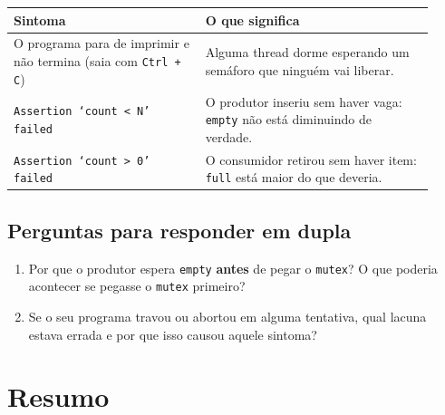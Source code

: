 \documentclass[11pt,a4paper]{article}
\newcommand{\cmd}[1]{\texttt{#1}}
\begin{document}
\begin{center}
\begin{tabular}{@{}R{0.42\linewidth}R{0.5\linewidth}@{}}
\toprule
\textbf{Sintoma} & \textbf{O que significa} \\
\midrule
O programa para de imprimir e não termina (saia com \cmd{Ctrl + C}) & Alguma thread dorme esperando um semáforo que ninguém vai liberar. \\
\cmd{Assertion `count < N' failed} & O produtor inseriu sem haver vaga: \cmd{empty} não está diminuindo de verdade. \\
\cmd{Assertion `count > 0' failed} & O consumidor retirou sem haver item: \cmd{full} está maior do que deveria. \\
\bottomrule
\end{tabular}
\end{center}

\subsection{Perguntas para responder em dupla}

\begin{enumerate}
    \item Por que o produtor espera \cmd{empty} \textbf{antes} de pegar o \cmd{mutex}? O que poderia acontecer se pegasse o \cmd{mutex} primeiro?
    \item Se o seu programa travou ou abortou em alguma tentativa, qual lacuna estava errada e por que isso causou aquele sintoma?
\end{enumerate}

\section{Resumo}
\end{document}
